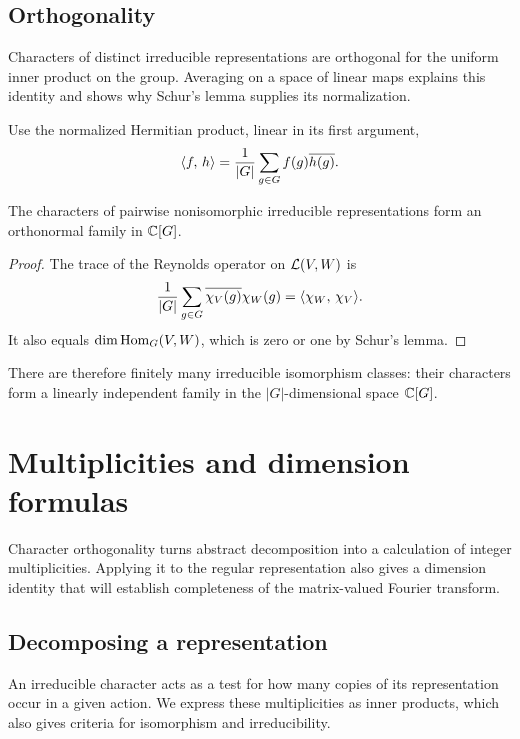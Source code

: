 \subsection{Orthogonality}

Characters of distinct irreducible representations are orthogonal for the
uniform inner product on the group. Averaging on a space of linear maps
explains this identity and shows why Schur's lemma supplies its
normalization.

Use the normalized Hermitian product, linear in its first argument,
\[
 \langle f,\,h\rangle=\frac1{|G|}\sum_{g\in G}f(g)\overline{h(g)}.
\]


\begin{thm}
\label{thm-orthogonalite-character-group-non-commutative}
The characters of pairwise nonisomorphic irreducible representations
form an orthonormal family in $\mathbb{C}[G]$.
\end{thm}
\begin{proof}
The trace of the Reynolds operator on $\mathcal{L}(V,W)$ is
\[
 \frac1{|G|}\sum_{g\in G}\overline{\chi_V(g)}\chi_W(g)
       =\langle \chi_W,\,\chi_V\rangle.
\]
It also equals $\dim\operatorname{Hom}_G(V,W)$, which is zero or one by Schur's lemma.
\end{proof}
There are therefore finitely many irreducible isomorphism classes: their
characters form a linearly independent family in the $|G|$-dimensional
space $\mathbb{C}[G]$.

\section{Multiplicities and dimension formulas}

Character orthogonality turns abstract decomposition into a calculation of
integer multiplicities. Applying it to the regular representation also gives
a dimension identity that will establish completeness of the matrix-valued
Fourier transform.

\subsection{Decomposing a representation}
\label{sect2-decomposition-representation}

An irreducible character acts as a test for how many copies of its
representation occur in a given action. We express these multiplicities as
inner products, which also gives criteria for isomorphism and
irreducibility.

